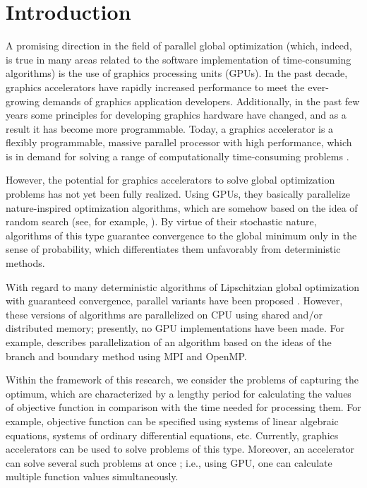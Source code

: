 \documentclass{svproc}
\begin{document}
\section{Introduction}

A promising direction in the field of parallel global optimization (which, indeed, is true in many areas related to the software implementation of time-consuming algorithms) is the use of graphics processing units (GPUs). In the past decade, graphics accelerators have rapidly increased performance to meet the ever-growing demands of graphics application developers. Additionally, in the past few years some principles for developing graphics hardware have changed, and as a result it has become more programmable. Today, a graphics accelerator is a flexibly programmable, massive parallel processor with high performance, which is in demand for solving a range of computationally time-consuming problems \cite{Hwu2011}.

However, the potential for graphics accelerators to solve global optimization problems has not yet been fully realized. Using  GPUs, they basically parallelize nature-inspired optimization algorithms, which are somehow based on the idea of random search (see, for example, \cite{Ferreiro2013,Garcia2014,Langdon2011}). By virtue of their stochastic nature, algorithms of this type guarantee convergence to the global minimum only in the sense of probability, which differentiates them unfavorably from deterministic methods.

With regard to many deterministic algorithms of Lipschitzian global optimization with guaranteed convergence, parallel variants have been proposed \cite{Evtushenko2009,He2008,Paulavicius2011}. However, these versions of algorithms are parallelized on CPU using shared and/or distributed memory; presently, no GPU implementations have been made. For example, \cite{Paulavicius2011} describes parallelization of an algorithm based on the ideas of the branch and boundary method using MPI and OpenMP.

Within the framework of this research, we consider the problems of capturing the optimum, which are characterized by a lengthy period for calculating the values of objective function in comparison with the time needed for processing them. For example, objective function can be specified using systems of linear algebraic equations, systems of ordinary differential equations, etc. Currently, graphics accelerators can be used to solve problems of this type. Moreover, an accelerator can solve several such problems at once \cite{Kindratenko2014}; i.e., using GPU, one can calculate multiple function values simultaneously.
\end{document}
